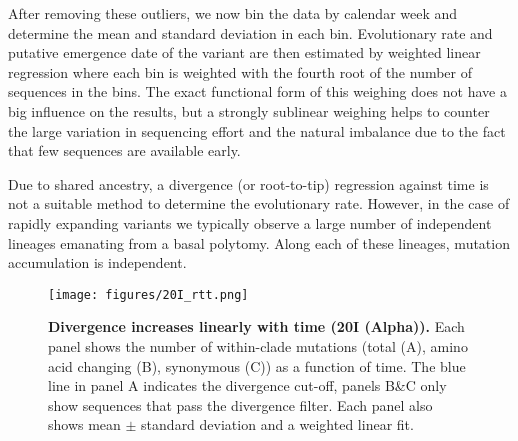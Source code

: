 \documentclass[aps,rmp, onecolumn]{revtex4}
\begin{document}
After removing these outliers, we now bin the data by calendar week and determine the mean and standard deviation in each bin.
Evolutionary rate and putative emergence date of the variant are then estimated by weighted linear regression where each bin is weighted with the fourth root of the number of sequences in the bins.
The exact functional form of this weighing does not have a big influence on the results, but a strongly sublinear weighing helps to counter the large variation in sequencing effort and the natural imbalance due to the fact that few sequences are available early.

Due to shared ancestry, a divergence (or root-to-tip) regression against time is not a suitable method to determine the evolutionary rate.
However, in the case of rapidly expanding variants we typically observe a large number of independent lineages emanating from a basal polytomy.
Along each of these lineages, mutation accumulation is independent.
\begin{figure*}
    \texttt{[image: figures/20I\_rtt.png]}
    \caption{{\bf Divergence increases linearly with time (20I (Alpha)).} Each panel shows the number of within-clade mutations (total (A), amino acid changing (B), synonymous (C)) as a function of time.
    The blue line in panel A indicates the divergence cut-off, panels B\&C only show sequences that pass the divergence filter. Each panel also shows mean $\pm$ standard deviation and a weighted linear fit.}
\end{figure*}
\end{document}
